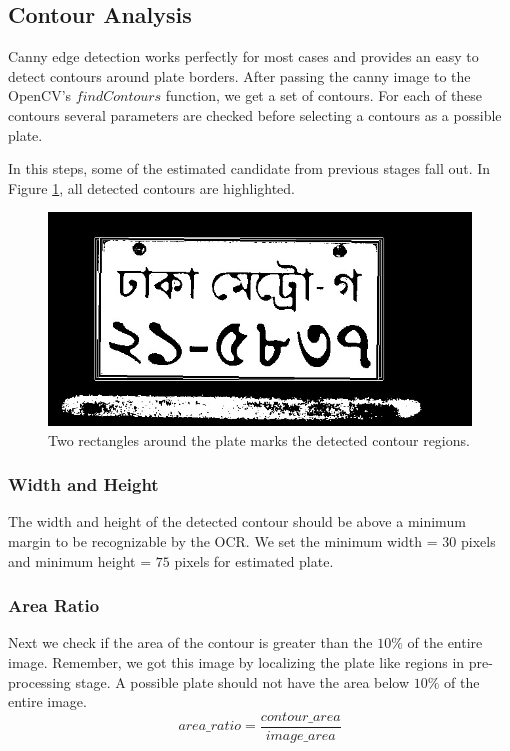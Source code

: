 \documentclass{standalone}
\begin{document}
\subsection{Contour Analysis}
Canny edge detection works perfectly for most cases and provides an easy to detect contours around plate borders. After passing the canny image to the OpenCV's $findContours$ function, we get a set of contours. For each of these contours several parameters are checked before selecting a contours as a possible plate.

In this steps, some of the estimated candidate from previous stages fall out. In Figure \ref{fig:ContourImage}, all detected contours are highlighted.
\begin{figure}
    \centering
    \includegraphics[width=.7\linewidth]{./img/sample/stage9.jpg}
    \caption{Two rectangles around the plate marks the detected contour regions.}
    \label{fig:ContourImage}
\end{figure}



\subsubsection{Width and Height}
The width and height of the detected contour should be above a minimum margin to be recognizable by the OCR. We set the minimum width = $30$ pixels and minimum height = $75$ pixels for estimated plate.

\subsubsection{Area Ratio}
Next we check if the area of the contour is greater than the $10\%$ of the entire image. Remember, we got this image by localizing the plate like regions in pre-processing stage. A possible plate should not have the area below $10\%$ of the entire image.
\begin{equation}
area\_ratio = \dfrac{contour\_area}{image\_area }
\end{equation}
\end{document}
